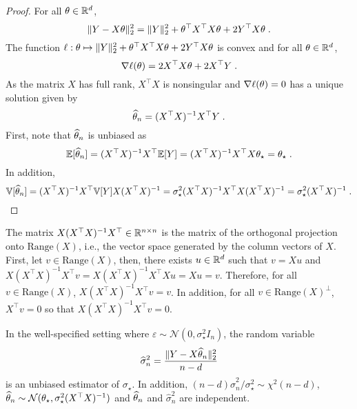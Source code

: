 \begin{proof}
For all $\theta\in\mathbb{R}^d$,
\[
 \|Y - X\theta\|_2^2 = \|Y\|_2^2 + \theta^\top X^\top X\theta + 2Y^\top X\theta\;.
\]
The function $\ell:\theta \mapsto\|Y\|_2^2 + \theta^\top X^\top X\theta + 2Y^\top X\theta$ is convex and for all $\theta\in\mathbb{R}^d$,
\[
\nabla \ell (\theta) = 2X^\top X\theta + 2 X^\top Y\;.
\]
As the matrix  $X$ has full rank, $X^\top X$ is nonsingular and $\nabla \ell (\theta) =0$ has a unique solution given by
\[
\widehat {\theta}_n = (X^\top X)^{-1}X^\top Y\;.
\]
First, note that $\widehat {\theta}_n$ is unbiased as
\[
\mathbb{E}[\widehat {\theta}_n] = (X^\top X)^{-1}X^\top \mathbb{E}[Y] = (X^\top X)^{-1}X^\top X\theta_{\star} = \theta_\star\;.
\]
In addition,
\[
\mathbb{V}[\widehat {\theta}_n] = (X^\top X)^{-1}X^\top\mathbb{V}[Y]X(X^\top X)^{-1}= \sigma_\star^2(X^\top X)^{-1}X^\top X(X^\top X)^{-1} = \sigma_\star^2(X^\top X)^{-1}\;.
\]
\end{proof}

\begin{remark}
\label{reg:linear:projX}
The matrix $X(X^\top X)^{-1}X^\top \in\mathbb{R}^{n\times n}$ is the matrix of the orthogonal projection onto $\mathrm{Range}(X)$, i.e., the vector space generated by the column vectors of $X$. First, let $v \in \mathrm{Range}(X)$, then, there exists $u\in\mathbb{R}^d$ such that $v = Xu$ and $X(X^\top X)^{-1}X^\top v = X(X^\top X)^{-1}X^\top Xu = Xu = v$. Therefore, for all $v \in \mathrm{Range}(X)$, $X(X^\top X)^{-1}X^\top v=v$. In addition, for all $v\in \mathrm{Range}(X)^\perp$, $X^\top v = 0$ so that $X(X^\top X)^{-1}X^\top v = 0$. 
\end{remark}


\begin{shaded}
\begin{proposition}
\label{prop:least:squares:full:rank:variance}
In the well-specified setting where $\varepsilon \sim \mathcal{N}(0,\sigma_\star^2I_n)$, the random variable
\[
\widehat \sigma^2_n =\frac{\|Y - X\widehat {\theta}_n \|_2^2}{n-d}
\]
is an unbiased estimator of $\sigma_\star$. In addition, $(n-d)\widehat \sigma^2_n/\sigma_\star^2\sim\chi^2(n-d)$, $\widehat {\theta}_n \sim \mathcal{N}(\theta_{\star},\sigma_\star^2(X^\top X)^{-1})$ and $\widehat {\theta}_n$ and $\widehat \sigma^2_n$ are independent.
\end{proposition}
\end{shaded}

